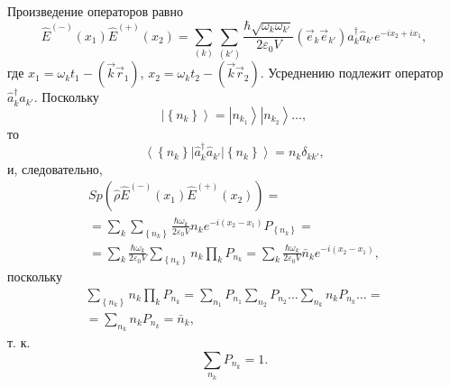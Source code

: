 Произведение операторов равно
\begin{equation}
\hat{E}^{(-)}\left(x_1\right)
\hat{E}^{(+)}\left(x_2\right) = \sum_{(k)}\sum_{(k')}
\frac{\hbar \sqrt{\omega_k \omega_{k'}}}{2 \varepsilon_0 V}
\left(\vec{e}_k\vec{e}_{k'}\right)
\hat{a}_k^{\dag}\hat{a}_{k'}
e^{-i x_2 + i x_1},
\label{eqCh4_21}
\end{equation}
где  $x_1 = \omega_k t_1 - \left(\vec{k}\vec{r}_1\right)$,
$x_2 = \omega_k t_2 - \left(\vec{k}\vec{r}_2\right)$.
Усреднению подлежит оператор $\hat{a}_k^{\dag}\hat{a}_{k'}$. Поскольку
\[\left|\left\{n_{k}\right\}\right> = 
\left|n_{k_1}\right>
\left|n_{k_2}\right> \dots,
\] 
то 
\[
\left<\left\{n_{k}\right\}\right|
\hat{a}_k^{\dag}\hat{a}_{k'}
\left|\left\{n_{k}\right\}\right> = 
n_k \delta_{kk'},
\]
и, следовательно, 
\begin{eqnarray}
Sp \left(
\hat{\rho}\hat{E}^{(-)}\left(x_1\right)
\hat{E}^{(+)}\left(x_2\right)
\right) = 
\nonumber \\
=\sum_{k}\sum_{\left\{n_{k}\right\}}
\frac{\hbar \omega_k}{2 \varepsilon_0 V} n_k e^{-i \left(x_2 - x_1
  \right)} 
P_{\left\{n_k\right\}} =
\nonumber \\
= \sum_{k}
\frac{\hbar \omega_k}{2 \varepsilon_0 V}
\sum_{\left\{n_{k}\right\}} n_k
\prod_k P_{n_k} =
\sum_{k} 
\frac{\hbar \omega_k}{2 \varepsilon_0 V}
\bar{n}_k e^{-i \left(x_2 - x_1\right)},
\nonumber
\end{eqnarray}
поскольку
\begin{eqnarray}
\sum_{\left\{n_{k}\right\}} n_k
\prod_kP_{n_k} = 
\sum_{n_1}P_{n_1} 
\sum_{n_2}P_{n_2}
\dots
\sum_{n_k}n_kP_{n_k}
\dots = 
\nonumber \\
=   \sum_{n_k}n_kP_{n_k} = \bar{n}_k,
\nonumber
\end{eqnarray}
т. к.
\[
\sum_{n_k}P_{n_k} = 1.
\]

